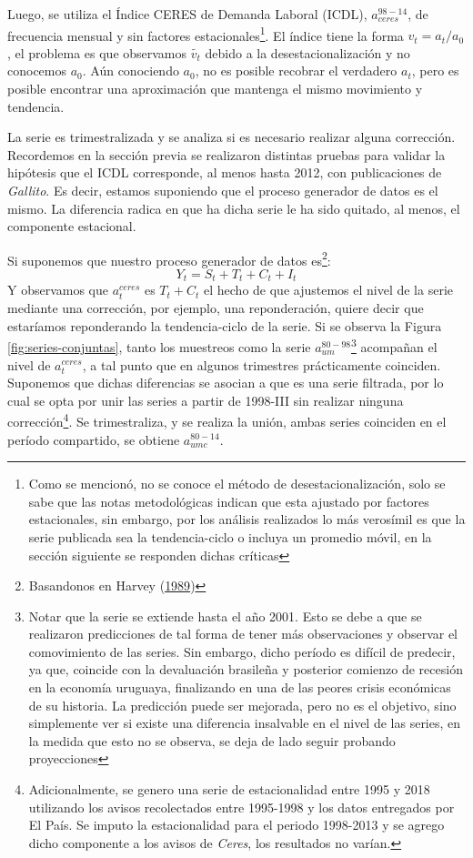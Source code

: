 \documentclass[12pt,oneside]{reedthesis}
\begin{document}
Luego, se utiliza el Índice CERES de Demanda Laboral (ICDL), \(a_{ceres}^{98-14}\), de frecuencia mensual y sin factores estacionales\footnote{Como se mencionó, no se conoce el método de desestacionalización, solo se sabe que las notas metodológicas indican que esta ajustado por factores estacionales, sin embargo, por los análisis realizados lo más verosímil es que la serie publicada sea la tendencia-ciclo o incluya un promedio móvil, en la sección siguiente se responden dichas críticas}. El índice tiene la forma \(v_t = a_t/a_0\), el problema es que observamos \(\tilde{v_t}\) debido a la desestacionalización y no conocemos \(a_0\). Aún conociendo \(a_0\), no es posible recobrar el verdadero \(a_t\), pero es posible encontrar una aproximación que mantenga el mismo movimiento y tendencia.

La serie es trimestralizada y se analiza si es necesario realizar alguna corrección. Recordemos en la sección previa se realizaron distintas pruebas para validar la hipótesis que el ICDL corresponde, al menos hasta 2012, con publicaciones de \emph{Gallito}. Es decir, estamos suponiendo que el proceso generador de datos es el mismo. La diferencia radica en que ha dicha serie le ha sido quitado, al menos, el componente estacional.

Si suponemos que nuestro proceso generador de datos es\footnote{Basandonos en Harvey (\protect\hyperlink{ref-Harvey1989}{1989})}:
\begin{equation}
Y_t = S_t + T_t + C_t + I_t
\end{equation}
Y observamos que \(a_t^{ceres}\) es \(T_t + C_t\) el hecho de que ajustemos el nivel de la serie mediante una corrección, por ejemplo, una reponderación, quiere decir que estaríamos reponderando la tendencia-ciclo de la serie. Si se observa la Figura \ref{fig:series-conjuntas}, tanto los muestreos como la serie \(a_{um}^{80-98}\)\footnote{Notar que la serie se extiende hasta el año 2001. Esto se debe a que se realizaron predicciones de tal forma de tener más observaciones y observar el comovimiento de las series. Sin embargo, dicho período es difícil de predecir, ya que, coincide con la devaluación brasileña y posterior comienzo de recesión en la economía uruguaya, finalizando en una de las peores crisis económicas de su historia. La predicción puede ser mejorada, pero no es el objetivo, sino simplemente ver si existe una diferencia insalvable en el nivel de las series, en la medida que esto no se observa, se deja de lado seguir probando proyecciones} acompañan el nivel de \(a_t^{ceres}\), a tal punto que en algunos trimestres prácticamente coinciden. Suponemos que dichas diferencias se asocian a que es una serie filtrada, por lo cual se opta por unir las series a partir de 1998-III sin realizar ninguna corrección\footnote{Adicionalmente, se genero una serie de estacionalidad entre 1995 y 2018 utilizando los avisos recolectados entre 1995-1998 y los datos entregados por El País. Se imputo la estacionalidad para el periodo 1998-2013 y se agrego dicho componente a los avisos de \emph{Ceres}, los resultados no varían.}.
Se trimestraliza, y se realiza la unión, ambas series coinciden en el período compartido, se obtiene \(a_{umc}^{80-14}\).
\end{document}
